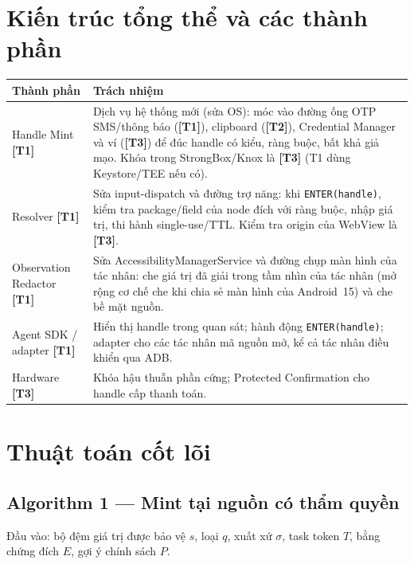 \documentclass[11pt,a4paper]{article}
\newcommand{\code}[1]{\texttt{\small #1}}
\newcommand{\Tone}{\textbf{\color{shgreen}[T1]}}
\newcommand{\Ttwo}{\textbf{\color{shblue}[T2]}}
\newcommand{\Tthree}{\textbf{\color{shgray}[T3]}}
\begin{document}
\section{Kiến trúc tổng thể và các thành phần}

\begin{center}
\begin{tabularx}{\textwidth}{@{}p{3.4cm}X@{}}
\toprule
\textbf{Thành phần} & \textbf{Trách nhiệm} \\
\midrule
Handle Mint \Tone & Dịch vụ hệ thống mới (sửa OS): móc vào đường ống OTP SMS/thông báo (\Tone), clipboard (\Ttwo),
Credential Manager và ví (\Tthree) để đúc handle có kiểu, ràng buộc, bất khả giả mạo. Khóa trong StrongBox/Knox là \Tthree
(T1 dùng Keystore/TEE nếu có). \\
Resolver \Tone & Sửa input-dispatch và đường trợ năng: khi \code{ENTER(handle)}, kiểm tra package/field của node
đích với ràng buộc, nhập giá trị, thi hành single-use/TTL. Kiểm tra origin của WebView là \Tthree. \\
Observation Redactor \Tone & Sửa AccessibilityManagerService và đường chụp màn hình của tác nhân: che giá trị đã
giải trong tầm nhìn của tác nhân (mở rộng cơ chế che khi chia sẻ màn hình của Android~15) và che bề mặt nguồn. \\
Agent SDK / adapter \Tone & Hiển thị handle trong quan sát; hành động \code{ENTER(handle)}; adapter cho các tác
nhân mã nguồn mở, kể cả tác nhân điều khiển qua ADB. \\
Hardware \Tthree & Khóa hậu thuẫn phần cứng; Protected Confirmation cho handle cấp thanh toán. \\
\bottomrule
\end{tabularx}
\end{center}

\section{Thuật toán cốt lõi}

\subsection{Algorithm 1 --- Mint tại nguồn có thẩm quyền}

Đầu vào: bộ đệm giá trị được bảo vệ $s$, loại $q$, xuất xứ $\sigma$, task token $T$, bằng chứng đích $E$,
gợi ý chính sách $P$.
\end{document}
